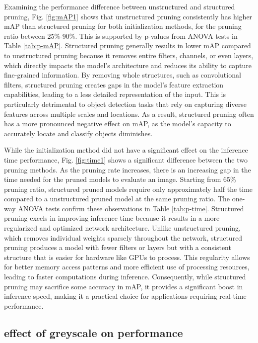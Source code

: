 \documentclass[journal,onecolumn,12pt]{IEEEtran}
\begin{document}
Examining the performance difference between unstructured and structured pruning, Fig. \ref{fig:mAP1} shows that unstructured pruning consistently has higher mAP than structured pruning for both initialization methods, for the pruning ratio between 25\%-90\%. This is supported by p-values from ANOVA tests in Table \ref{tab:p-mAP}. Structured pruning generally results in lower mAP compared to unstructured pruning because it removes entire filters, channels, or even layers, which directly impacts the model’s architecture and reduces its ability to capture fine-grained information. By removing whole structures, such as convolutional filters, structured pruning creates gaps in the model’s feature extraction capabilities, leading to a less detailed representation of the input. This is particularly detrimental to object detection tasks that rely on capturing diverse features across multiple scales and locations. As a result, structured pruning often has a more pronounced negative effect on mAP, as the model’s capacity to accurately locate and classify objects diminishes.

While the initialization method did not have a significant effect on the inference time performance, Fig. \ref{fig:time1} shows a significant difference between the two pruning methods. As the pruning rate increases, there is an increasing gap in the time needed for the pruned models to evaluate an image. Starting from 65\% pruning ratio, structured pruned models require only approximately half the time compared to a unstructured pruned model at the same pruning ratio. The one-way ANOVA tests confirm these observations in Table \ref{tab:p-time}. Structured pruning excels in improving inference time because it results in a more regularized and optimized network architecture. Unlike unstructured pruning, which removes individual weights sparsely throughout the network, structured pruning produces a model with fewer filters or layers but with a consistent structure that is easier for hardware like GPUs to process. This regularity allows for better memory access patterns and more efficient use of processing resources, leading to faster computations during inference. Consequently, while structured pruning may sacrifice some accuracy in mAP, it provides a significant boost in inference speed, making it a practical choice for applications requiring real-time performance.

\subsection{effect of greyscale on performance}
\end{document}

